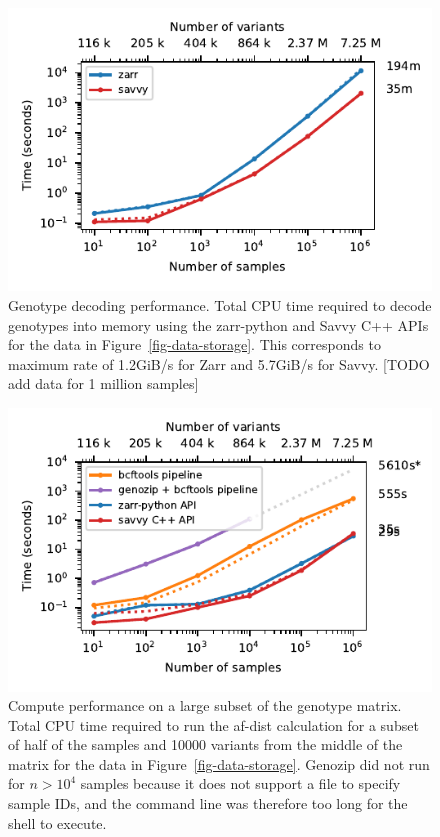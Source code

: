 \documentclass[a4paper,num-refs]{oup-contemporary}
\begin{document}
\begin{figure}
\includegraphics{figures/whole-matrix-decode}
\caption{Genotype decoding performance.
Total CPU time required to decode genotypes into memory using the zarr-python
and Savvy C++ APIs for the data in Figure~\ref{fig-data-storage}.
This corresponds to maximum rate of 1.2GiB/s for Zarr and 5.7GiB/s
for Savvy. [TODO add data for 1 million samples]
\label{fig-whole-matrix-decode}}
\end{figure}

\begin{figure}
\includegraphics{figures/subset-matrix-compute-supplemental}
\caption{Compute performance on a large subset of the genotype matrix.
Total CPU time required to run the af-dist calculation for
a subset of half of the samples and 10000 variants from the middle of the matrix
for the data in Figure~\ref{fig-data-storage}.
Genozip did not run for
$n > 10^4$ samples because it does not support a file to specify
sample IDs, and the command line was therefore too long for the shell
to execute. 
\label{fig-subset-matrix-compute-supplemental}}
\end{figure}
\end{document}
